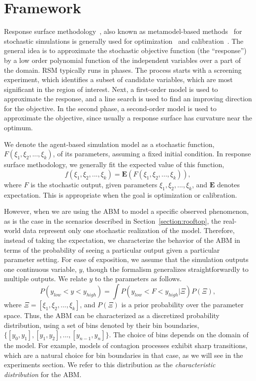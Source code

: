 \section{Framework}
\label{sec:framework}

Response surface methodology~\cite{box51response,carley04response}, also known as metamodel-based methods~\cite{barton06metamodel} for stochastic simulations is generally used for optimization~\cite{neddermeijer00response} and calibration~\cite{fadikar17emulation, lamperti18calibration}.
The general idea is to approximate the stochastic objective function (the ``response'') by a low order polynomial function
of the independent variables over a part of the domain.
RSM typically runs in phases. The process starts with a screening experiment, which identifies a subset of
candidate variables, which are most significant in the region of interest.
Next, a first-order model is used to approximate the response, and a line search is used to 
find an improving direction for the objective.
In the second phase, a second-order model is used to approximate the objective, since
usually a response surface has curvature near the optimum.


We denote the agent-based simulation model as a stochastic function, $F(\xi_1, \xi_2, ..., \xi_k)$, of its parameters, assuming a fixed initial condition. In response surface methodology, we generally fit the expected value of this function,
\begin{equation}
f(\xi_1, \xi_2, ..., \xi_k) = \mathbf{E}(F(\xi_1, \xi_2, ..., \xi_k)),
\end{equation}
where $F$ is the stochastic output, given parameters $\xi_1, \xi_2, ..., \xi_k$, and $\mathbf{E}$ denotes expectation. This is appropriate when the goal is optimization or calibration.

However, when we are using the ABM to model a specific observed phenomenon, as is the case in the scenarios described in Section~\ref{section:rooftop}, the real-world data represent only one stochastic realization of the model.
Therefore, instead of taking the expectation, we characterize the behavior of the ABM in terms of the probability of seeing a particular output given a particular
parameter setting. For ease of exposition, we assume that the simulation outputs one continuous variable, $y$, though the
formalism generalizes straightforwardly to multiple outputs. We relate $y$ to the parameters as follows.
\begin{equation}
P(y_{low} < y < y_{high}) = \int P(y_{low} < F < y_{high}|\Xi)P(\Xi),
\label{eqn:output_probability}
\end{equation}
where $\Xi = [\xi_1, \xi_2, ..., \xi_k]$, and $P(\Xi)$ is a prior probability over the parameter space. Thus, the ABM can be
characterized as a discretized probability distribution, using a set of bins denoted by their bin boundaries, $\{[y_0,y_1], [y_1,y_2], ..., [y_{n-1}, y_n]\}$.
The choice of bins depends on the domain of the model. For example, models of contagion processes exhibit sharp
transitions, which are a natural choice for bin boundaries in that case, as we will see in the experiments section. We
refer to this distribution as the \emph{characteristic distribution} for the ABM.


